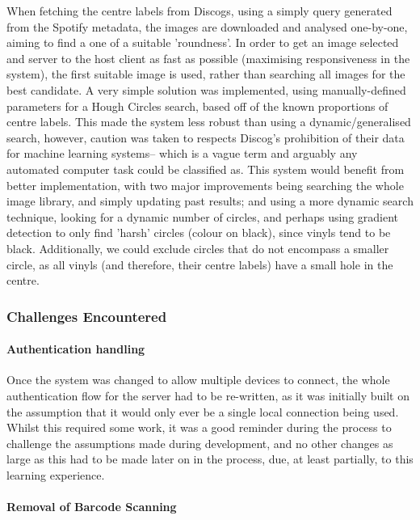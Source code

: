            When fetching the centre labels from Discogs, using a simply query generated from the Spotify metadata, the images are downloaded and analysed one-by-one, aiming to find a one of a suitable 'roundness'. In order to get an image selected and server to the host client as fast as possible (maximising responsiveness in the system), the first suitable image is used, rather than searching all images for the best candidate. A very simple solution was implemented, using manually-defined parameters for a Hough Circles search, based off of the known proportions of centre labels. This made the system less robust than using a dynamic/generalised search, however, caution was taken to respects Discog's prohibition of their data for machine learning systems-- which is a vague term and arguably any automated computer task could be classified as. This system would benefit from better implementation, with two major improvements being searching the whole image library, and simply updating past results; and using a more dynamic search technique, looking for a dynamic number of circles, and perhaps using gradient detection to only find 'harsh' circles (colour on black), since vinyls tend to be black. Additionally, we could exclude circles that do not encompass a smaller circle, as all vinyls (and therefore, their centre labels) have a small hole in the centre.
    
            \subsubsection{Challenges Encountered}
    
                \paragraph{Authentication handling}
    
                Once the system was changed to allow multiple devices to connect, the whole authentication flow for the server had to be re-written, as it was initially built on the assumption that it would only ever be a single local connection being used. Whilst this required some work, it was a good reminder during the process to challenge the assumptions made during development, and no other changes as large as this had to be made later on in the process, due, at least partially, to this learning experience.
    
                \paragraph{Removal of Barcode Scanning}
    
